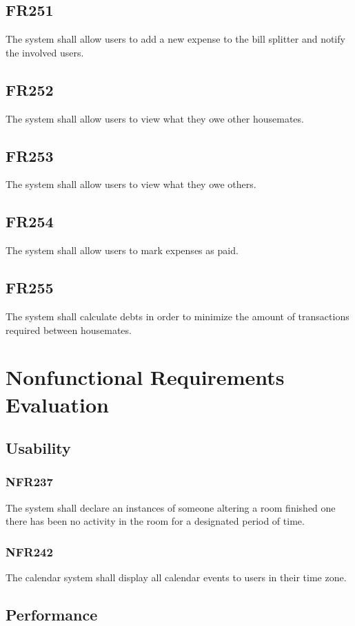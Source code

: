 \documentclass[12pt, titlepage]{article}
\begin{document}
\subsection{FR251}
The system shall allow users to add a new expense to the bill splitter and notify the involved users.

\subsection{FR252}
The system shall allow users to view what they owe other housemates.

\subsection{FR253}
The system shall allow users to view what they owe others.

\subsection{FR254}
The system shall allow users to mark expenses as paid.

\subsection{FR255}
The system shall calculate debts in order to minimize the amount of transactions required between housemates.


\section{Nonfunctional Requirements Evaluation}
\subsection{Usability}
\subsubsection{NFR237}
The system shall declare an instances of someone altering a room
finished one there has been no activity in the room for a designated period
of time.
\subsubsection{NFR242}
The calendar system shall display all calendar events to users in
their time zone.

\subsection{Performance}
\end{document}
